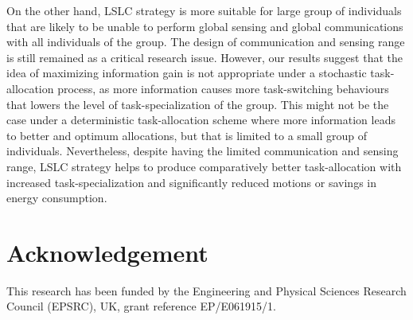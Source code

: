 \documentclass[final,5p,times,twocolumn]{elsarticle}
\begin{document}
On the other hand, LSLC strategy is more suitable for large group of individuals that are likely to be unable to perform global sensing and global communications with all individuals of the group. The design of communication and sensing range is still remained as a critical research issue. However, our results suggest that the idea of maximizing information gain is not appropriate under a stochastic task-allocation process, as more information causes more task-switching behaviours that lowers the level of task-specialization of the group. This might not be the case under a deterministic task-allocation scheme where more information leads to better and optimum allocations, but that is limited to a small group of individuals. Nevertheless, despite having the limited communication and sensing range, LSLC strategy helps to produce comparatively better task-allocation with increased task-specialization and significantly reduced motions or savings in energy consumption.
\section*{Acknowledgement}
This research has been funded by the Engineering and Physical Sciences Research Council (EPSRC), UK, grant reference EP/E061915/1.



\end{document}
